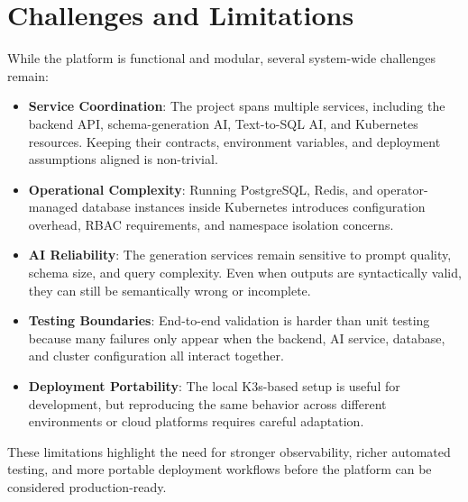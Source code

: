 \section{Challenges and Limitations}
\label{sec:7.2_challenges}

While the platform is functional and modular, several system-wide challenges remain:

\begin{itemize}
   \item \textbf{Service Coordination}: The project spans multiple services, including the backend API, schema-generation AI, Text-to-SQL AI, and Kubernetes resources. Keeping their contracts, environment variables, and deployment assumptions aligned is non-trivial.
   \item \textbf{Operational Complexity}: Running PostgreSQL, Redis, and operator-managed database instances inside Kubernetes introduces configuration overhead, RBAC requirements, and namespace isolation concerns.
   \item \textbf{AI Reliability}: The generation services remain sensitive to prompt quality, schema size, and query complexity. Even when outputs are syntactically valid, they can still be semantically wrong or incomplete.
   \item \textbf{Testing Boundaries}: End-to-end validation is harder than unit testing because many failures only appear when the backend, AI service, database, and cluster configuration all interact together.
   \item \textbf{Deployment Portability}: The local K3s-based setup is useful for development, but reproducing the same behavior across different environments or cloud platforms requires careful adaptation.
\end{itemize}

These limitations highlight the need for stronger observability, richer automated testing, and more portable deployment workflows before the platform can be considered production-ready.
